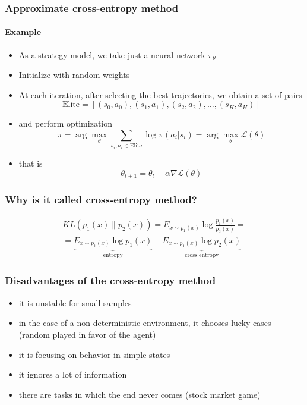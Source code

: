 \documentclass[fullscreen=true, bookmarks=true, hyperref={pdfencoding=unicode}]{beamer}
\begin{document}
\begin{frame}
  \frametitle{Approximate cross-entropy method}
    \framesubtitle{Example}

   \begin{itemize}
     \pause
     \item As a strategy model, we take just a neural network $\pi_\theta$

     \pause
     \item Initialize with random weights

     \pause
     \item At each iteration, after selecting the best trajectories, we obtain a set of pairs
       $$\text{Elite} = [(s_0, a_0), (s_1, a_1), (s_2, a_2), \dots, (s_H, a_H )]$$

     \pause
     \item and perform optimization
       $$ \pi = \arg\max\limits_\theta \sum\limits_{s_i, a_i \in \text{Elite}} \log \pi(a_i|s_i) = \arg\max\limits_\theta \mathscr{ L}(\theta)$$

     \pause
     \item that is
       $$ \theta_{t+1} = \theta_{t} + \alpha \nabla \mathscr{L}(\theta) $$
   \end{itemize}
\end{frame}


\begin{frame}
  \frametitle{Why is it called cross-entropy method?}

   \begin{align*}
     KL(p_1(x) \| p_2(x)) = E_{x \sim p_1(x)} \log \frac{p_1(x)}{p_2(x)} = \\
     =
     \underbrace{E_{x \sim p_1(x)} \log {p_1(x)}}_{
       \text{entropy}
     }-
     \underbrace{E_{x \sim p_1(x)} \log {p_2(x)}}_{
     \text{cross entropy}
     }
   \end{align*}
\end{frame}


\begin{frame}
  \frametitle{Disadvantages of the cross-entropy method}

    \begin{itemize}
      \pause
      \item it is unstable for small samples
      \pause
      \item in the case of a non-deterministic environment, it chooses lucky cases (random played in favor of the agent)
      \pause
      \item it is focusing on behavior in simple states
      \pause
      \item it ignores a lot of information
      \pause
      \item there are tasks in which the end never comes (stock market game)
   \end{itemize}
\end{frame}
\end{document}
